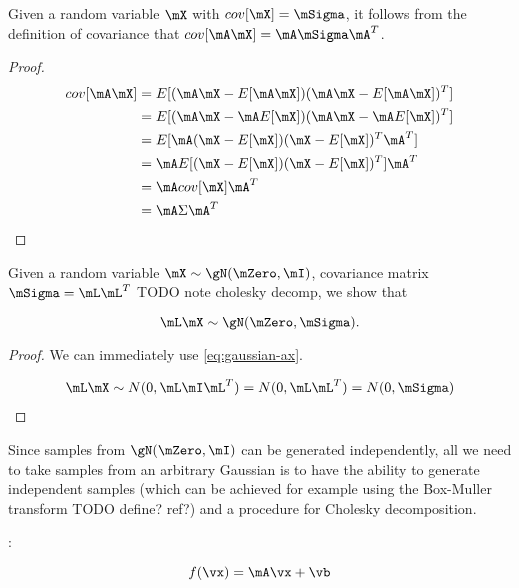 \begin{thm}
  Given a random variable $\mX$ with $cov[\mX] = \mSigma$, it follows from
  the definition of covariance that $cov[\mA \mX] = \mA \mSigma \mA^T$.
\end{thm}

\begin{proof}
  \begin{align}
    \label{eq:gaussian-ax}
    cov[\mA \mX] &= E[(\mA \mX - E[\mA \mX])(\mA \mX - E[\mA \mX])^T] \\
                 &= E[(\mA \mX - \mA E[\mX])(\mA \mX - \mA E[\mX])^T] \\
                 &= E[\mA (\mX - E[\mX])(\mX - E[\mX])^T \mA^T] \\
                 &= \mA E[(\mX - E[\mX])(\mX - E[\mX])^T] \mA^T \\
                 &= \mA cov[\mX] \mA^T \\
                 &= \mA \Sigma \mA^T
  \end{align}
\end{proof}

\begin{thm}
  Given a random variable $\mX \sim \gN(\mZero, \mI)$, covariance matrix
  $\mSigma = \mL \mL^T$ {TODO note cholesky decomp}, we show that

  \begin{equation}
    \mL \mX \sim \gN(\mZero, \mSigma).
  \end{equation}
\end{thm}

\begin{proof}
  We can immediately use \eqref{eq:gaussian-ax}.

  \begin{align}
    \mL \mX \sim N(0, \mL \mI \mL^T) = N(0, \mL \mL^T) = N(0, \mSigma)
  \end{align}
\end{proof}

Since samples from $\gN(\mZero, \mI)$ can be generated independently, all we
need to take samples from an arbitrary Gaussian is to have the ability to
generate independent samples (which can be achieved for example using the
Box-Muller transform {TODO define? ref?}) and a procedure for Cholesky
decomposition.

\begin{defn}
  :

  \begin{equation}
    f(\vx) = \mA \vx + \vb
  \end{equation}
\end{defn}

